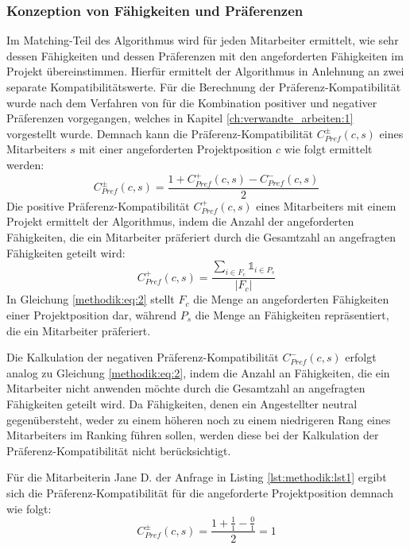 \subsubsection{Konzeption von Fähigkeiten und Präferenzen}
Im Matching-Teil des Algorithmus wird für jeden Mitarbeiter ermittelt, wie sehr dessen Fähigkeiten und dessen Präferenzen mit den angeforderten Fähigkeiten im Projekt übereinstimmen.
Hierfür ermittelt der Algorithmus in Anlehnung an \textcite[S. 207ff.]{pizzato:2010} zwei separate Kompatibilitätswerte.
Für die Berechnung der Präferenz-Kompatibilität wurde nach dem Verfahren von \textcite[S. 269ff.]{pizzato:2:inproceedings} für die Kombination positiver und negativer Präferenzen vorgegangen, welches in Kapitel \ref{ch:verwandte_arbeiten:1} vorgestellt wurde.
Demnach kann die Präferenz-Kompatibilität $C_{Pref}^{\pm}(c,s)$ eines Mitarbeiters $s$ mit einer angeforderten Projektposition $c$ wie folgt ermittelt werden:
\begin{equation}\label{methodik:eq:1}
    C_{Pref}^{\pm}(c,s)=\frac{1+C_{Pref}^{+}(c,s)-C_{Pref}^{-}(c,s)}{2}
\end{equation}
Die positive Präferenz-Kompatibilität $C_{Pref}^{+}(c,s)$ eines Mitarbeiters mit einem Projekt ermittelt der Algorithmus, indem die Anzahl der angeforderten Fähigkeiten, die ein Mitarbeiter präferiert durch die Gesamtzahl an angefragten Fähigkeiten geteilt wird:
\begin{equation}\label{methodik:eq:2}
    C_{Pref}^{+}(c,s)=\frac{\sum\limits_{i \in F_{c}} \mathbb{1}_{i \in P_{s}}}{|F_{c}|}
\end{equation}
In Gleichung \ref{methodik:eq:2} stellt $F_{c}$ die Menge an angeforderten Fähigkeiten einer Projektposition dar, während $P_{s}$ die Menge an Fähigkeiten repräsentiert, die ein Mitarbeiter präferiert.

Die Kalkulation der negativen Präferenz-Kompatibilität $C_{Pref}^{-}(c,s)$ erfolgt analog zu Gleichung \ref{methodik:eq:2}, indem die Anzahl an Fähigkeiten, die ein Mitarbeiter nicht anwenden möchte durch die Gesamtzahl an angefragten Fähigkeiten geteilt wird.
Da Fähigkeiten, denen ein Angestellter neutral gegenübersteht, weder zu einem höheren noch zu einem niedrigeren Rang eines Mitarbeiters im Ranking führen sollen, werden diese bei der Kalkulation der Präferenz-Kompatibilität nicht berücksichtigt.

Für die Mitarbeiterin Jane D. der Anfrage in Listing \ref{lst:methodik:lst1} ergibt sich die Präferenz-Kompatibilität für die angeforderte Projektposition demnach wie folgt:
\begin{equation}\label{methodik:eq:4}
    C_{Pref}^{\pm}(c,s) = \frac{1+\frac{1}{1}-\frac{0}{1}}{2} = 1
\end{equation}

